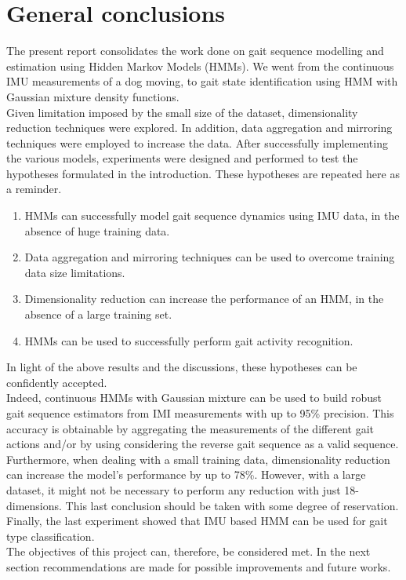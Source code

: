 \chapter{General conclusions}
The present report consolidates the work done on gait sequence modelling and estimation using Hidden Markov Models (HMMs). 
We went from the continuous IMU measurements of a dog moving, to gait state identification using HMM with Gaussian mixture density functions.\\
Given limitation imposed by the small size of the dataset, dimensionality reduction techniques were explored. In addition, data aggregation and mirroring techniques were employed to increase the data. After successfully implementing the various models, experiments were designed and performed to test the hypotheses formulated in the introduction. These hypotheses are repeated here as a reminder.
\begin{enumerate}
	\item HMMs can successfully model gait sequence dynamics using IMU data, in the absence of huge training data.
	\item Data aggregation and mirroring techniques can be used to overcome training data size limitations.
	\item Dimensionality reduction can increase the performance of an HMM, in the absence of a large training set.
	\item HMMs can be used to successfully perform gait activity recognition.
\end{enumerate}
In light of the above results and the discussions, these hypotheses can be confidently accepted. \\
Indeed, continuous HMMs with Gaussian mixture can be used to build robust gait sequence estimators from IMI measurements with up to 95\% precision.
This accuracy is obtainable by aggregating the measurements of the different gait actions and/or by using considering the reverse gait sequence as a valid sequence.\\
Furthermore, when dealing with a small training data, dimensionality reduction can increase the model's performance by up to 78\%. However, with a large dataset, it might not be necessary to perform any reduction with just 18-dimensions. This last conclusion should be taken with some degree of reservation.
Finally, the last experiment showed that IMU based HMM can be used for gait type classification.\\
The objectives of this project can, therefore, be considered met. In the next section recommendations are made for possible improvements and future works.